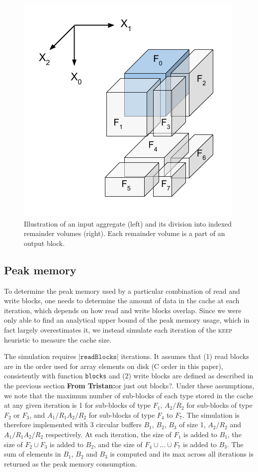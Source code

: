 \documentclass[sigconf, nonacm]{acmart}
\newcommand{\tristan}[1]{\color{orange}\textbf{From Tristan:}#1\color{black}}
\newcommand{\keep}[0]{\textsc{keep}\xspace}
\begin{document}
\begin{figure}[h]
  \centering
  \includegraphics[scale=0.4]{./figures/figure_3.png}
  \caption{Illustration of an input aggregate (left) and its division into indexed remainder volumes (right).
  Each remainder volume is a part of an output block.}
  \label{fig:nomenclature_overlaps}
  \end{figure}

\subsection{Peak memory}

To determine the peak memory used by a particular combination of read and
write blocks, one needs to determine the amount of data in the cache at
each iteration, which depends on how read and write blocks overlap. Since we were only able to find an analytical
upper bound of the peak memory usage, which in fact largely overestimates
it, we instead simulate each iteration of the \keep heuristic to measure
the cache size.

The simulation requires $\vert \texttt{readBlocks} \vert$ iterations. It
assumes that (1) read blocks are in the order used for array elements on
disk (C order in this paper), consistently with function \texttt{blocks}
and (2) write blocks are defined as described in the previous section
\tristan{or just out blocks?}. Under these assumptions, we note that the
maximum number of sub-blocks of each type stored in the cache at any given
iteration is 1 for sub-blocks of type $F_1$, $A_2/R_2$ for sub-blocks of
type $F_2$ or $F_3$, and $A_1/R_1A_2/R_2$ for sub-blocks of type $F_4$ to
$F_7$. The simulation is therefore implemented with 3 circular buffers
$B_1$, $B_2$, $B_3$ of size 1, $A_2/R_2$ and $A_1/R_1A_2/R_2$ respectively.
At each iteration, the size of $F_1$ is added to $B_1$, the size of $F_2
\cup F_3$ is added to $B_2$, and the size of $F_4 \cup \ldots \cup F_7$ is
added to $B_3$. The sum of elements in $B_1$, $B_2$ and $B_3$ is computed
and its max across all iterations is returned as the peak memory
consumption.
\end{document}
